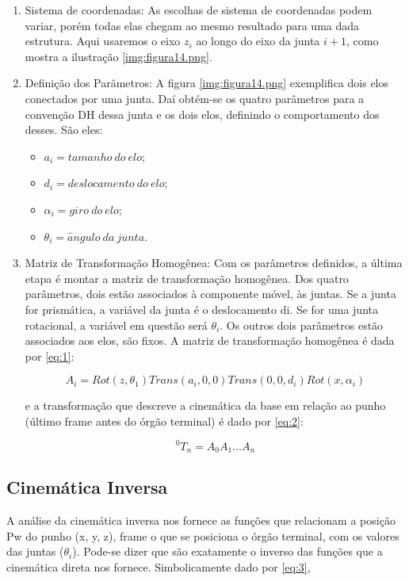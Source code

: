 \begin{enumerate}
	\item Sistema de coordenadas: As escolhas de sistema de coordenadas podem variar, porém todas elas chegam ao mesmo resultado para uma dada estrutura. Aqui usaremos o eixo $z_i$ ao longo do eixo da junta $i+1$, como mostra a ilustração \ref{img:figura14.png}.
	\item Definição dos Parâmetros: A figura \ref{img:figura14.png} exemplifica dois elos conectados por uma junta. Daí obtém-se os quatro parâmetros para a convenção DH dessa junta e os dois elos, definindo o comportamento dos desses. São eles:
	
		\begin{itemize}
			\item $a_i = tamanho\:do\:elo;$
			\item $d_i = deslocamento\:do\:elo;$
			\item $\alpha_i = giro\:do\:elo;$
			\item $\theta_i =  \hat{a}ngulo\:da\:junta. $
		\end{itemize}
	
	
	\item  Matriz de Transformação Homogênea: Com os parâmetros definidos, a última etapa é montar a matriz de transformação homogênea. Dos quatro parâmetros, dois estão associados à componente móvel, às juntas. Se a junta for prismática, a variável da junta é o deslocamento di. Se for uma junta rotacional, a variável em questão será $\theta_i$. Os outros dois parâmetros estão associados aos elos, são fixos. A matriz de transformação homogênea é dada por \eqref{eq:1}:

\begin{equation}
	A_i = Rot(z,\theta_1)Trans(a_i, 0, 0)Trans(0, 0, d_i)Rot(x,\alpha_i)
	\label{eq:1}
\end{equation}
		
e a transformação que descreve a cinemática da base em relação ao punho (último frame antes do órgão terminal) é dado por \eqref{eq:2}:

\begin{equation}
	^0T_n = A_0A_1...A_n
	\label{eq:2}
\end{equation}

\end{enumerate}

\subsection{Cinemática Inversa}
A análise da cinemática inversa nos fornece as funções que relacionam a posição Pw do punho (x, y, z), frame o que se posiciona o órgão terminal, com os valores das juntas ($\theta_i$). Pode-se dizer que são
exatamente o inverso das funções que a cinemática direta nos fornece. Simbolicamente dado por \eqref{eq:3},

